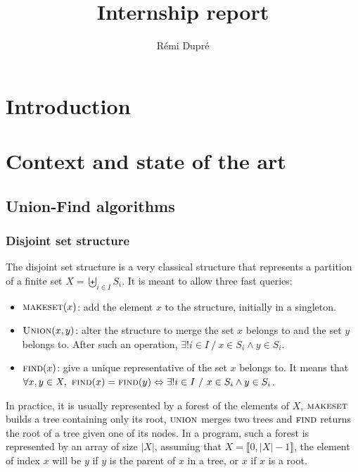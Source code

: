 \documentclass[12px]{article}
\title{Internship report}
\author{Rémi Dupré}
\begin{document}
  \maketitle
  \pagebreak

  \tableofcontents
  \pagebreak

  \section{Introduction}

  \section{Context and state of the art}
    \subsection{Union-Find algorithms}
      \subsubsection{Disjoint set structure}
        The disjoint set structure is a very classical structure that represents a partition of a finite set $X = \biguplus\limits_{i \in I} S_i$. It is meant to allow three fast queries:
        \begin{itemize}
          \item $\Call{makeset}{x}$: add the element $x$ to the structure, initially in a singleton.
          \item $\Call{Union}{x, y}$: alter the structure to merge the set $x$ belongs to and the set $y$ belongs to. After such an operation, $\exists! i \in I~/~x \in S_i \land y \in S_i$.
          \item $\Call{find}{x}$: give a unique representative of the set $x$ belongs to. It means that $\forall x, y \in X,~\Call{find}{x} = \Call{find}{y} \Leftrightarrow \exists! i \in I~/~x \in S_i \land y \in S_i$.
        \end{itemize}

        In practice, it is usually represented by a forest of the elements of $X$, $\textsc{makeset}$ builds a tree containing only its root, $\textsc{union}$ merges two trees and $\textsc{find}$ returns the root of a tree given one of its nodes.
        In a program, such a forest is represented by an array of size $|X|$, assuming that $X = \llbracket 0, |X|-1 \rrbracket$, the element of index $x$ will be $y$ if $y$ is the parent of $x$ in a tree, or $x$ if $x$ is a root.
\end{document}
